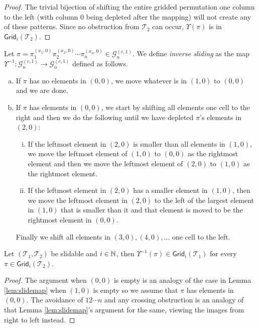 \begin{proof}
The trivial bijection of shifting the entire gridded permutation one column to the left (with column $0$ being depleted after the mapping) will not create any of these patterns. Since no obstruction from $\mathcal{T}_2$ can occur, $\Upsilon(\pi)$ is in $\textsf{Grid}_i(\mathcal{T}_2)$.
\end{proof}

\begin{definition}
Let $\pi = \pi_1^{(x_1,0)}\pi_2^{(x_2,0)}\cdots\pi_n^{(x_n,0)} \in \mathcal{G}^{(c,1)}_n$. We define \emph{inverse sliding} as the map $\Upsilon^{-1}: \mathcal{G}^{(c,1)}_n \to \mathcal{G}^{(c,1)}_n$ defined as follows.
\begin{enumerate}[a)]
    \item If $\pi$ has no elements in $(0,0)$, we move whatever is in $(1,0)$ to $(0,0)$ and we are done.
    \item If $\pi$ has elements in $(0,0)$, we start by shifting all elements one cell to the right and then we do the following until we have depleted $\pi$'s elements in $(2,0)$:
    \begin{enumerate}[i.]
        \item If the leftmost element in $(2,0)$ is smaller than all elements in $(1,0)$, we move the leftmost element of $(1,0)$ to $(0,0)$ as the rightmost element and then we move the leftmost element of $(2,0)$ to $(1,0)$ as the rightmost element.
        \item If the leftmost element in $(2,0)$ has a smaller element in $(1,0)$, then we move the leftmost element in $(2,0)$ to the left of the largest element in $(1,0)$ that is smaller than it and that element is moved to be the rightmost element in $(0,0)$.
    \end{enumerate}
    Finally we shift all elements in $(3,0), (4,0), \ldots$ one cell to the left.
\end{enumerate}
\end{definition}

\begin{lemma}
Let $(\mathcal{T}_1,\mathcal{T}_2)$ be slidable and $i \in \mathbb{N}$, then $\Upsilon^{-1}(\pi) \in \textsf{Grid}_i(\mathcal{T}_1)$ for every $\pi \in \textsf{Grid}_i(\mathcal{T}_2)$.
\end{lemma}
\begin{proof}
The argument when $(0,0)$ is empty is an analogy of the case in Lemma \ref{lem:slidemap} when $(1,0)$ is empty so we assume that $\pi$ has elements in $(0,0)$. The avoidance of $12\cdots n$ and any crossing obstruction is an analogy of that Lemma \ref{lem:slidemap}'s argument for the same, viewing the images from right to left instead.
\end{proof}

